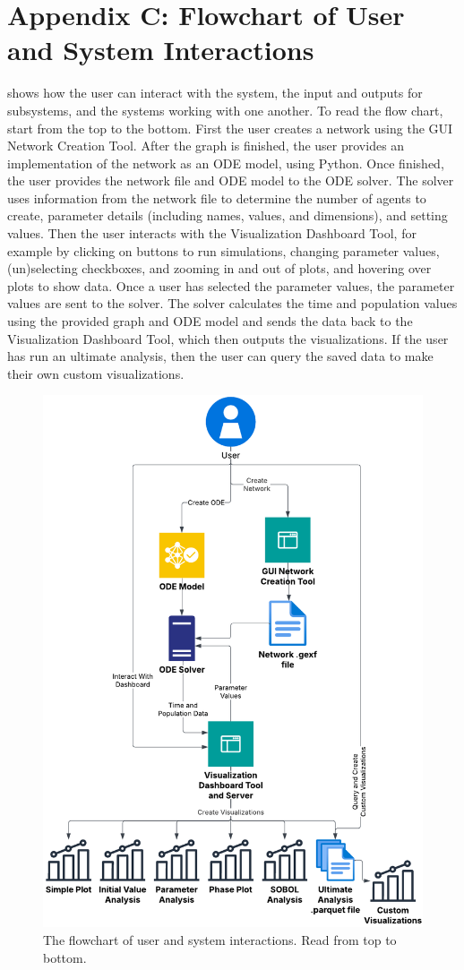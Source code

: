 \chapter{Appendix C: Flowchart of User and System Interactions}
\label{AppendixC}

 shows how the user can interact with the system, the input and outputs for subsystems, and the systems working with one another. 
    To read the flow chart, start from the top to the bottom. 
    First the user creates a network using the GUI Network Creation Tool. 
    After the graph is finished, the user provides an implementation of the network as an ODE model, using Python. 
    Once finished, the user provides the network file and ODE model to the ODE solver. 
    The solver uses information from the network file to determine the number of agents to create, parameter details (including names, values, and dimensions), and setting values.
    Then the user interacts with the Visualization Dashboard Tool, for example by clicking on buttons to run simulations, changing parameter values, (un)selecting checkboxes, and zooming in and out of plots, and hovering over plots to show data. 
    Once a user has selected the parameter values, the parameter values are sent to the solver. 
    The solver calculates the time and population values using the provided graph and ODE model and sends the data back to the Visualization Dashboard Tool, which then outputs the visualizations. 
    If the user has run an ultimate analysis, then the user can query the saved data to make their own custom visualizations.
\begin{figure}
    \centering
    \includegraphics[width=0.8\linewidth]{Images/interaction_diagram.pdf}
    \captionsetup{width=1\linewidth}
    \caption{
        The flowchart of user and system interactions. Read from top to bottom. 
    }
    \label{fig:interaction_diagram}
\end{figure} 